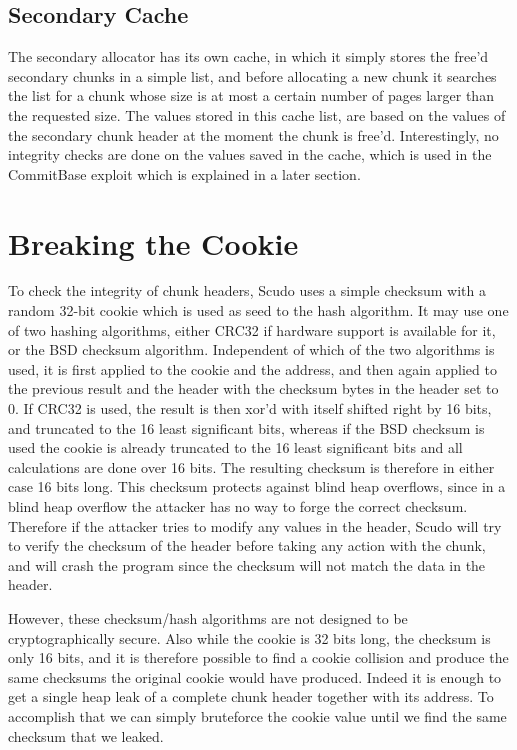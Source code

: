 \documentclass[a4paper,11pt,oneside]{report}
\begin{document}
\section{Secondary Cache}

The secondary allocator has its own cache, in which it simply stores the free'd secondary
chunks in a simple list, and before allocating a new chunk it searches the list for a
chunk whose size is at most a certain number of pages larger than the requested size. The
values stored in this cache list, are based on the values of the secondary chunk header at
the moment the chunk is free'd. Interestingly, no integrity checks are done on the values
saved in the cache, which is used in the CommitBase exploit which is explained in a later
section.


\chapter{Breaking the Cookie}

To check the integrity of chunk headers, Scudo uses a simple checksum with a random 32-bit
cookie which is used as seed to the hash algorithm. It may use one of two hashing
algorithms, either CRC32 if hardware support is available for it, or the BSD checksum
algorithm. Independent of which of the two algorithms is used, it is first applied to the
cookie and the address, and then again applied to the previous result and the header with
the checksum bytes in the header set to 0. If CRC32 is used, the result is then xor'd with
itself shifted right by 16 bits, and truncated to the 16 least significant bits, whereas
if the BSD checksum is used the cookie is already truncated to the 16 least significant
bits and all calculations are done over 16 bits. The resulting checksum is therefore in
either case 16 bits long.
This checksum protects against blind heap overflows, since in a blind heap overflow the
attacker has no way to forge the correct checksum. Therefore if the attacker tries to
modify any values in the header, Scudo will try to verify the checksum of the header
before taking any action with the chunk, and will crash the program since the checksum
will not match the data in the header.

However, these checksum/hash algorithms are not designed to be cryptographically
secure. Also while the cookie is 32 bits long, the checksum is only 16 bits, and it is
therefore possible to find a cookie collision and produce the same checksums the original
cookie would have produced. Indeed it is enough to get a single heap leak of a complete
chunk header together with its address. To accomplish that we can simply bruteforce the
cookie value until we find the same checksum that we leaked.
\end{document}

